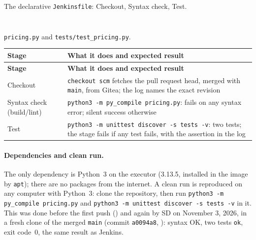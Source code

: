 \begin{longlisting}
\inputminted[fontsize=\scriptsize]{groovy}{config/twintrack/Jenkinsfile}
\caption{The declarative \texttt{Jenkinsfile}: Checkout, Syntax check, Test.}
\label{Listing:JenkinsFile}
\end{longlisting}

\begin{longlisting}
\inputminted[fontsize=\scriptsize]{python}{config/twintrack/pricing.py}
\inputminted[fontsize=\scriptsize]{python}{config/twintrack/tests/test_pricing.py}
\caption{\texttt{pricing.py} and \texttt{tests/test\_pricing.py}.}
\label{Listing:JenkinsApp}
\end{longlisting}

\begin{tabularx}{\linewidth}{L{3.2cm}Y}
\caption{Pipeline stages\label{Table:JenkinsStages}}\\
\toprule \textbf{Stage} & \textbf{What it does and expected result}\\ \midrule
\endfirsthead
\toprule \textbf{Stage} & \textbf{What it does and expected result}\\ \midrule
\endhead \bottomrule \endlastfoot
Checkout & \texttt{checkout scm} fetches the pull request head, merged with \texttt{main}, from Gitea; the log names the exact revision\\
Syntax check (build/lint) & \texttt{python3 -m py\_compile pricing.py}: fails on any syntax error; silent success otherwise\\
Test & \texttt{python3 -m unittest discover -s tests -v}: two tests; the stage fails if any test fails, with the assertion in the log\\
\end{tabularx}

\paragraph{Dependencies and clean run.} The only dependency is Python~3 on the executor (3.13.5, installed in the image by
\texttt{apt}); there are no packages from the internet. A clean run is reproduced on any computer with Python~3: clone the repository, then run
\texttt{python3 -m py\_compile pricing.py} and \texttt{python3 -m unittest discover -s tests -v} in it. This was done before the
first push () and again by SD on November 3, 2026, in a fresh clone of the merged \texttt{main} (commit \texttt{a0094a8},
): syntax OK, two tests \texttt{ok}, exit code~0, the same result as Jenkins.

